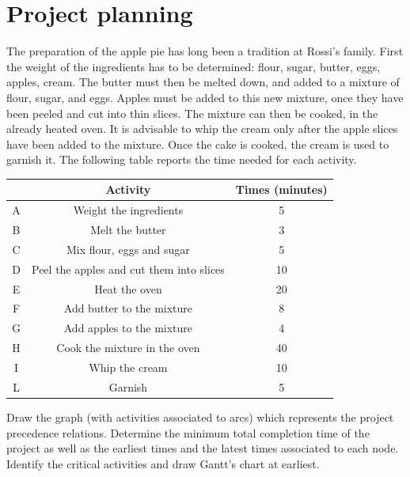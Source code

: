 \documentclass[12pt, a4paper]{report}
\newtheorem[style=M,bodystyle=\normalfont]{theorem}{Theorem}
\newtheorem[style=M,bodystyle=\normalfont]{corollary}{Corollary}
\newtheorem[style=M,bodystyle=\normalfont]{lemma}{Lemma}
\newtheorem[style=M,bodystyle=\normalfont]{definition}{Definition}
\begin{document}
    \newpage

    \section{Project planning}
        The preparation of the apple pie has long been a tradition at Rossi's family. First the weight of the ingredients has to be determined: flour, sugar, butter, eggs, 
        apples, cream. The butter must then be melted down, and added to a mixture of flour, sugar, and eggs. Apples must be added to this new mixture, once they have been 
        peeled and cut into thin slices. The mixture can then be cooked, in the already heated oven. It is advisable to whip the cream only after the apple slices have 
        been added to the mixture. Once the cake is cooked, the cream is used to garnish it. The following table reports the time needed for each activity.
        \begin{table}[H]
            \centering
            \begin{tabular}{ccc}
            \hline
            \textbf{} & \textbf{Activity}                        & \textbf{Times (minutes)} \\ \hline
            A         & Weight the ingredients                   & 5                        \\
            B         & Melt the butter                          & 3                        \\
            C         & Mix flour, eggs and sugar                & 5                        \\
            D         & Peel the apples and cut them into slices & 10                       \\
            E         & Heat the oven                            & 20                       \\
            F         & Add butter to the mixture                & 8                        \\
            G         & Add apples to the mixture                & 4                        \\
            H         & Cook the mixture in the oven             & 40                       \\
            I         & Whip the cream                           & 10                       \\
            L         & Garnish                                  & 5                        \\ \hline
            \end{tabular}
        \end{table}
        Draw the graph (with activities associated to arcs) which represents the project precedence relations. Determine the minimum total completion time of the project 
        as well as the earliest times and the latest times associated to each node. Identify the critical activities and draw Gantt's chart at earliest.
\end{document}
